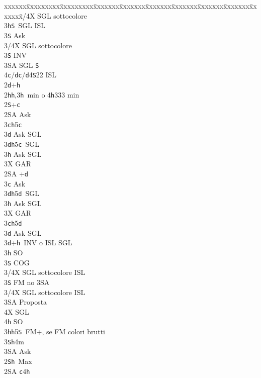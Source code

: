 \documentclass[a4paper,italian]{article}
\newcommand{\BS}{\small{\texttt{S}}}
\newcommand{\BC}{\small{\texttt{c}}}
\newcommand{\BD}{\small{\texttt{d}}}
\newcommand{\BH}{\small{\texttt{h}}}
\newenvironment{bidtable}
{\begin{tabbing}

    xxxxxx\=xxxxxxxxx\=xxxxxxxxx\=xxxxxxx\=xxxxxxx\=xxxxxxx\=xxxxxxx\=xxxxxxx\=xxxxxxx\=xxxxxxx\=\kill}
{\end{tabbing} }%
\begin{document}
\begin{multicols}{2}
\begin{bidtable}
        3/4X \> SGL sottocolore\-\-\\
        3\BH {}\BS\ SGL ISL\+\\
        3\BS \> Ask\+\\
        3/4X \> SGL sottocolore\-\-\\
        3\BS \> INV\\
        3\small{SA} \> SGL \BS \\
        4\BC/\BD {}\BC /\BD 4\BS 22 ISL\-\-\\
        2\BD {}+\BH \+\\
        2\BH {}\BH ,3\BH\ min o 4\BH 333 min\+\\
        2\BS {}+\BC \+\\
        2\small{SA} \> Ask\+\\
        3\BC {}\BH 5\BC \+\\
        3\BD \> Ask SGL\-\\
        3\BD {}\BH 5\BC\ SGL\+\\
        3\BH \> Ask SGL\-\\
        3X \> GAR\-\-\\
        2\small{SA} +\BD \+\\
        3\BC \> Ask\+\\
        3\BD {}\BH 5\BD\ SGL\+\\
        3\BH \> Ask SGL\-\\
        3X \> GAR\-\-\\
        3\BC {}\BH 5\BD \+\\
        3\BD \> Ask SGL\-\\
        3\BD {}+\BH\ INV o ISL SGL\+\\
        3\BH \> SO\+\\
        3\BS \> COG\\
        3/4X \> SGL sottocolore ISL\-\\
        3\BS \> FM no 3\small{SA}\+\\
        3/4X \> SGL sottocolore ISL\-\\
        3\small{SA} \> Proposta\+\\
        4X \> SGL\\
        4\BH \> SO\-\-\\
        3\BH {}\BH 5\BS\ FM+, se FM colori brutti\\
        3\BS {}\BH 4m\+\\
        3\small{SA} \> Ask\-\-\\
        2\BS {}\BH\ Max\+\\
        2\small{SA} \BC 4\BH \+\\

\end{bidtable}
\end{multicols}
\end{document}
